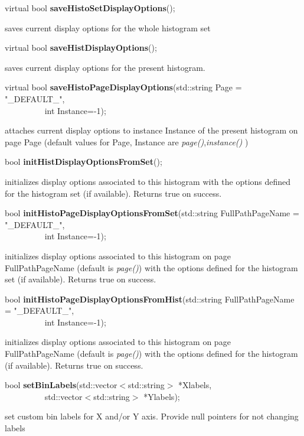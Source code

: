 \item    virtual bool {\bf saveHistoSetDisplayOptions}();


 saves current display options for the whole histogram set


\item    virtual bool {\bf saveHistDisplayOptions}();


 saves current display options for the present histogram.


\item    virtual bool {\bf saveHistoPageDisplayOptions}(std::string Page = "\_DEFAULT\_",\\\mbox{}~~~~~~~~~
					   int Instance=-1);

 attaches current display options to instance Instance of the present histogram on page 
 Page (default values for Page, Instance are {\it page()},{\it instance()}  )


\item    bool {\bf initHistDisplayOptionsFromSet}(); 


 initializes display options associated to this histogram with the
 options defined for the histogram set (if available). Returns true on
 success.


\item    bool {\bf initHistoPageDisplayOptionsFromSet}(std::string FullPathPageName = "\_DEFAULT\_",\\\mbox{}~~~~~~~~~
					  int Instance=-1);

 initializes display options associated to this histogram on page
 FullPathPageName (default is {\it page()}) with the
 options defined for the histogram set (if available). Returns true on
 success.


\item    bool {\bf initHistoPageDisplayOptionsFromHist}(std::string FullPathPageName = "\_DEFAULT\_",\\\mbox{}~~~~~~~~~
					   int Instance=-1);

 initializes display options associated to this histogram on page
 FullPathPageName (default is {\it page()}) with the
 options defined for the histogram (if available). Returns true on
 success.


\item    bool {\bf setBinLabels}(std::vector$<$std::string$>$ *Xlabels,\\\mbox{}~~~~~~~~~ 
                    std::vector$<$std::string$>$ *Ylabels);

 set custom bin labels for X and/or Y axis. Provide null pointers for not changing labels


